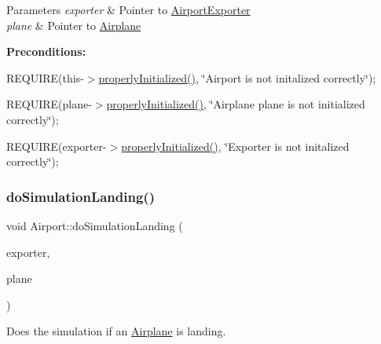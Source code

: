 \begin{DoxyParams}{Parameters}
{\em exporter} & Pointer to \mbox{\hyperlink{class_airport_exporter}{Airport\+Exporter}} \\
\hline
{\em plane} & Pointer to \mbox{\hyperlink{class_airplane}{Airplane}}\\
\hline
\end{DoxyParams}
{\bfseries Preconditions\+:}
\begin{DoxyItemize}
\item R\+E\+Q\+U\+I\+RE(this-\/$>$\mbox{\hyperlink{class_airport_aa13e68ac58e8875837fbe888325cfff6}{properly\+Initialized()}}, \char`\"{}\+Airport is not initalized correctly\char`\"{});
\item R\+E\+Q\+U\+I\+RE(plane-\/$>$\mbox{\hyperlink{class_airport_aa13e68ac58e8875837fbe888325cfff6}{properly\+Initialized()}}, \char`\"{}\+Airplane \textquotesingle{}plane\textquotesingle{} is not initialized correctly\char`\"{});
\item R\+E\+Q\+U\+I\+RE(exporter-\/$>$\mbox{\hyperlink{class_airport_aa13e68ac58e8875837fbe888325cfff6}{properly\+Initialized()}}, \char`\"{}\+Exporter is not initalized correctly\char`\"{}); 
\end{DoxyItemize}\mbox{\label{class_airport_a42d696dbd56340c324c385945045f402}} 
\subsubsection{\texorpdfstring{do\+Simulation\+Landing()}{doSimulationLanding()}}
{\footnotesize\ttfamily void Airport\+::do\+Simulation\+Landing (\begin{DoxyParamCaption}\item[{\mbox{\hyperlink{class_airport_exporter}{Airport\+Exporter}} $\ast$}]{exporter,  }\item[{\mbox{\hyperlink{class_airplane}{Airplane}} $\ast$}]{plane }\end{DoxyParamCaption})}



Does the simulation if an \mbox{\hyperlink{class_airplane}{Airplane}} is landing. 


